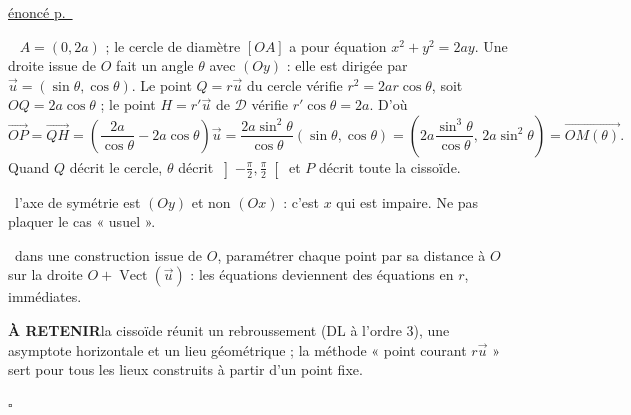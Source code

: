 \documentclass[a4paper,11pt]{article}
\numberwithin{equation}{section}
\numberwithin{figure}{section}
\numberwithin{table}{section}
\theoremstyle{enonce}
\theoremstyle{exemple}
\theoremstyle{remarque}
\newenvironment{corrige}[1]{%
  \par\needspace{6\baselineskip}\vspace{1em}\phantomsection\label{c:#1}%
  \noindent{\sffamily\bfseries\color{Bleu}Exercice~\ref{e:#1}}\quad
  {\scriptsize\sffamily\hyperref[e:#1]{\color{Gris}énoncé p.~\pageref{e:#1}}}\par\nobreak\vspace{0.2em}}%
  {\hfill\textcolor{BleuClair}{$\square$}\par}
\newcommand{\vect}{\operatorname{Vect}}
\newcommand{\vv}[1]{\overrightarrow{#1}}
\newcommand{\ve}[1]{\vec{#1}}
\newcommand{\gain}[1]{\par\noindent{\sffamily\bfseries\small\color{Ocre}Astuce.}\ #1\par}
\newcommand{\piege}[1]{\par\noindent{\sffamily\bfseries\small\color{Brique}Piège.}\ #1\par}
\newcommand{\retenir}[1]{\begin{retenirbox}{\sffamily\bfseries\footnotesize\color{Ocre}À RETENIR}\quad #1\end{retenirbox}}
\newcommand{\q}[1]{\par\smallskip\noindent{\sffamily\bfseries\color{Bleu}#1}\ }
\begin{document}
\begin{corrige}{td-c3}
\q{6.} $A=(0,2a)$ ; le cercle de diamètre $[OA]$ a pour équation $x^2+y^2=2ay$. Une droite issue de $O$ fait un angle $\theta$ avec
$(Oy)$ : elle est dirigée par $\ve u=(\sin\theta,\cos\theta)$. Le point $Q=r\ve u$ du cercle vérifie $r^2=2ar\cos\theta$, soit
$OQ=2a\cos\theta$ ; le point $H=r'\ve u$ de $\mathcal D$ vérifie $r'\cos\theta=2a$. D'où
\[\vv{OP}=\vv{QH}=\left(\frac{2a}{\cos\theta}-2a\cos\theta\right)\ve u=\frac{2a\sin^2\theta}{\cos\theta}(\sin\theta,\cos\theta)
=\left(2a\frac{\sin^3\theta}{\cos\theta},\,2a\sin^2\theta\right)=\vv{OM(\theta)}.\]
Quand $Q$ décrit le cercle, $\theta$ décrit $\left]-\frac\pi2,\frac\pi2\right[$ et $P$ décrit toute la cissoïde.
\begin{center}
\end{center}
\piege{l'axe de symétrie est $(Oy)$ et non $(Ox)$ : c'est $x$ qui est impaire. Ne pas plaquer le cas « usuel ».}
\gain{dans une construction issue de $O$, paramétrer chaque point par sa distance à $O$ sur la droite $O+\vect(\ve u)$ :
les équations deviennent des équations en $r$, immédiates.}
\retenir{la cissoïde réunit un rebroussement (DL à l'ordre 3), une asymptote horizontale et un lieu géométrique ; la méthode
« point courant $r\ve u$ » sert pour tous les lieux construits à partir d'un point fixe.}
\end{corrige}
\end{document}

